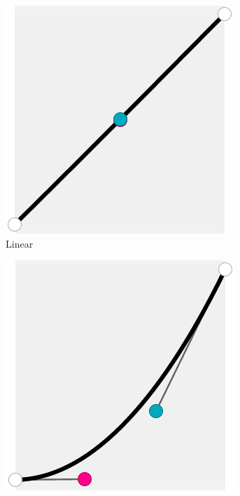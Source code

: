 \begin{figure}
	\centering
	\begin{subfigure}{0.24\textwidth}
		\centering
		\includegraphics[width=1\linewidth]{figures/approx_linear}
		\caption{Linear}
	\end{subfigure}
	\begin{subfigure}{0.24\textwidth}
		\centering
		\includegraphics[width=1\linewidth]{figures/approx_quad}

\end{subfigure}
\end{figure}
